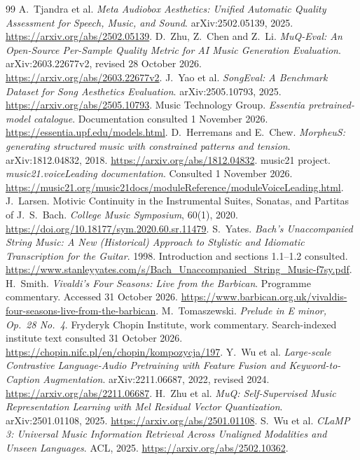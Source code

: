 \documentclass[11pt]{article}
\begin{document}
\begin{thebibliography}{99}
 A.~Tjandra et al. \emph{Meta Audiobox Aesthetics: Unified Automatic Quality Assessment for Speech, Music, and Sound}. arXiv:2502.05139, 2025. \url{https://arxiv.org/abs/2502.05139}.
 D.~Zhu, Z.~Chen and Z.~Li. \emph{MuQ-Eval: An Open-Source Per-Sample Quality Metric for AI Music Generation Evaluation}. arXiv:2603.22677v2, revised 28 October 2026. \url{https://arxiv.org/abs/2603.22677v2}.
 J.~Yao et al. \emph{SongEval: A Benchmark Dataset for Song Aesthetics Evaluation}. arXiv:2505.10793, 2025. \url{https://arxiv.org/abs/2505.10793}.
 Music Technology Group. \emph{Essentia pretrained-model catalogue}. Documentation consulted 1 November 2026. \url{https://essentia.upf.edu/models.html}.
 D.~Herremans and E.~Chew. \emph{MorpheuS: generating structured music with constrained patterns and tension}. arXiv:1812.04832, 2018. \url{https://arxiv.org/abs/1812.04832}.
 music21 project. \emph{music21.voiceLeading documentation}. Consulted 1 November 2026. \url{https://music21.org/music21docs/moduleReference/moduleVoiceLeading.html}.
 J.~Larsen. Motivic Continuity in the Instrumental Suites, Sonatas, and Partitas of J.~S.~Bach. \emph{College Music Symposium}, 60(1), 2020. \url{https://doi.org/10.18177/sym.2020.60.sr.11479}.
 S.~Yates. \emph{Bach's Unaccompanied String Music: A New (Historical) Approach to Stylistic and Idiomatic Transcription for the Guitar}. 1998. Introduction and sections 1.1--1.2 consulted. \url{https://www.stanleyyates.com/s/Bach_Unaccompanied_String_Music-f7sy.pdf}.
 H.~Smith. \emph{Vivaldi's Four Seasons: Live from the Barbican}. Programme commentary. Accessed 31 October 2026. \url{https://www.barbican.org.uk/vivaldis-four-seasons-live-from-the-barbican}.
 M.~Tomaszewski. \emph{Prelude in E minor, Op.~28 No.~4}. Fryderyk Chopin Institute, work commentary. Search-indexed institute text consulted 31 October 2026. \url{https://chopin.nifc.pl/en/chopin/kompozycja/197}.
 Y.~Wu et al. \emph{Large-scale Contrastive Language-Audio Pretraining with Feature Fusion and Keyword-to-Caption Augmentation}. arXiv:2211.06687, 2022, revised 2024. \url{https://arxiv.org/abs/2211.06687}.
 H.~Zhu et al. \emph{MuQ: Self-Supervised Music Representation Learning with Mel Residual Vector Quantization}. arXiv:2501.01108, 2025. \url{https://arxiv.org/abs/2501.01108}.
 S.~Wu et al. \emph{CLaMP 3: Universal Music Information Retrieval Across Unaligned Modalities and Unseen Languages}. ACL, 2025. \url{https://arxiv.org/abs/2502.10362}.

\end{thebibliography}
\end{document}
